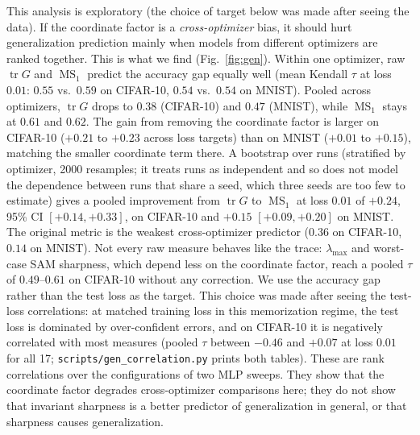 \documentclass[10pt]{article}
\theoremstyle{remark}
\newcommand{\tr}{\operatorname{tr}}
\newcommand{\MS}{\operatorname{MS}}
\begin{document}
This analysis is exploratory (the choice of target below was made after seeing the data). If the coordinate factor is a \emph{cross-optimizer} bias, it should hurt generalization prediction mainly when models from different optimizers are ranked together. This is what we find (Fig.~\ref{fig:gen}). Within one optimizer, raw $\tr G$ and $\MS_1$ predict the accuracy gap equally well (mean Kendall $\tau$ at loss $0.01$: $0.55$ vs.\ $0.59$ on CIFAR-10, $0.54$ vs.\ $0.54$ on MNIST). Pooled across optimizers, $\tr G$ drops to $0.38$ (CIFAR-10) and $0.47$ (MNIST), while $\MS_1$ stays at $0.61$ and $0.62$. The gain from removing the coordinate factor is larger on CIFAR-10 ($+0.21$ to $+0.23$ across loss targets) than on MNIST ($+0.01$ to $+0.15$), matching the smaller coordinate term there. A bootstrap over runs (stratified by optimizer, 2000 resamples; it treats runs as independent and so does not model the dependence between runs that share a seed, which three seeds are too few to estimate) gives a pooled improvement from $\tr G$ to $\MS_1$ at loss $0.01$ of $+0.24$, 95\% CI $[+0.14,+0.33]$, on CIFAR-10 and $+0.15$ $[+0.09,+0.20]$ on MNIST. The original metric is the weakest cross-optimizer predictor ($0.36$ on CIFAR-10, $0.14$ on MNIST). Not every raw measure behaves like the trace: $\lambda_{\max}$ and worst-case SAM sharpness, which depend less on the coordinate factor, reach a pooled $\tau$ of $0.49$--$0.61$ on CIFAR-10 without any correction. We use the accuracy gap rather than the test loss as the target. This choice was made after seeing the test-loss correlations: at matched training loss in this memorization regime, the test loss is dominated by over-confident errors, and on CIFAR-10 it is negatively correlated with most measures (pooled $\tau$ between $-0.46$ and $+0.07$ at loss $0.01$ for all 17; \texttt{scripts/gen\_correlation.py} prints both tables). These are rank correlations over the configurations of two MLP sweeps. They show that the coordinate factor degrades cross-optimizer comparisons here; they do not show that invariant sharpness is a better predictor of generalization in general, or that sharpness causes generalization.
\end{document}
